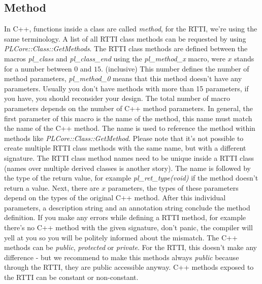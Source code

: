 \subsection{Method}
\label{ClassMembers:Method}
In C++, functions inside a class are called \emph{method}, for the RTTI, we're using the same terminology. A list of all RTTI class methods can be requested by using \emph{PLCore::Class::GetMethods}. The RTTI class methods are defined between the macros \emph{pl\_class} and \emph{pl\_class\_end} using the \emph{pl\_method\_x} macro, were $x$ stands for a number between $0$ and $15$. (inclusive) This number defines the number of method parameters, \emph{pl\_method\_0} means that this method doesn't have any parameters. Usually you don't have methods with more than 15 parameters, if you have, you should reconsider your design. The total number of macro parameters depends on the number of C++ method parameters. In general, the first parameter of this macro is the name of the method, this name must match the name of the C++ method. The name is used to reference the method within methods like \emph{PLCore::Class::GetMethod}. Please note that it's not possible to create multiple RTTI class methods with the same name, but with a different signature. The RTTI class method names need to be unique inside a RTTI class (names over multiple derived classes is another story). The name is followed by the type of the return value, for example \emph{pl\_ret\_type(void)} if the method doesn't return a value. Next, there are $x$ parameters, the types of these parameters depend on the types of the original C++ method. After this individual parameters, a description string and an annotation string conclude the method definition. If you make any errors while defining a RTTI method, for example there's no C++ method with the given signature, don't panic, the compiler will yell at you so you will be politely informed about the mismatch. The C++ methods can be \emph{public}, \emph{protected} or \emph{private}. For the RTTI, this doesn't make any difference - but we recommend to make this methods always \emph{public} because through the RTTI, they are public accessible anyway. C++ methods exposed to the RTTI can be constant or non-constant.

